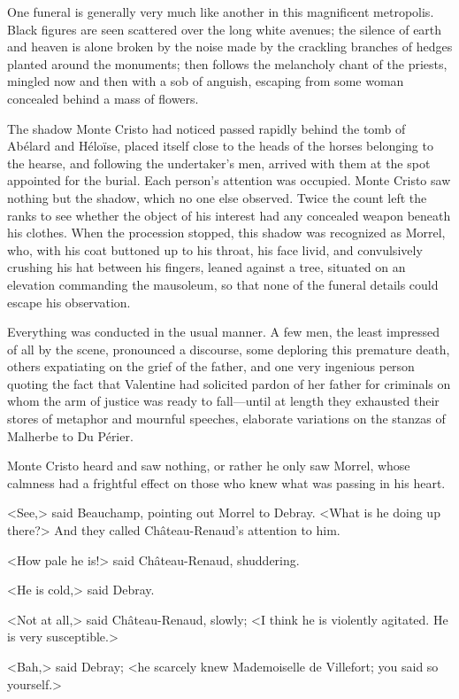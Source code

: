  One funeral is generally very much like another in this magnificent metropolis. Black figures are seen scattered over the long white avenues; the silence of earth and heaven is alone broken by the noise made by the crackling branches of hedges planted around the monuments; then follows the melancholy chant of the priests, mingled now and then with a sob of anguish, escaping from some woman concealed behind a mass of flowers. 

 The shadow Monte Cristo had noticed passed rapidly behind the tomb of Abélard and Héloïse, placed itself close to the heads of the horses belonging to the hearse, and following the undertaker's men, arrived with them at the spot appointed for the burial. Each person's attention was occupied. Monte Cristo saw nothing but the shadow, which no one else observed. Twice the count left the ranks to see whether the object of his interest had any concealed weapon beneath his clothes. When the procession stopped, this shadow was recognized as Morrel, who, with his coat buttoned up to his throat, his face livid, and convulsively crushing his hat between his fingers, leaned against a tree, situated on an elevation commanding the mausoleum, so that none of the funeral details could escape his observation. 

 Everything was conducted in the usual manner. A few men, the least impressed of all by the scene, pronounced a discourse, some deploring this premature death, others expatiating on the grief of the father, and one very ingenious person quoting the fact that Valentine had solicited pardon of her father for criminals on whom the arm of justice was ready to fall—until at length they exhausted their stores of metaphor and mournful speeches, elaborate variations on the stanzas of Malherbe to Du Périer. 

 Monte Cristo heard and saw nothing, or rather he only saw Morrel, whose calmness had a frightful effect on those who knew what was passing in his heart. 

 <See,> said Beauchamp, pointing out Morrel to Debray. <What is he doing up there?> And they called Château-Renaud's attention to him. 

 <How pale he is!> said Château-Renaud, shuddering. 

 <He is cold,> said Debray. 

 <Not at all,> said Château-Renaud, slowly; <I think he is violently agitated. He is very susceptible.> 

 <Bah,> said Debray; <he scarcely knew Mademoiselle de Villefort; you said so yourself.> 

